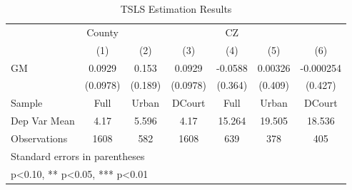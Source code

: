 \begin{table}[htbp]\centering
\def\sym#1{\ifmmode^{#1}\else\(^{#1}\)\fi}
\caption{TSLS Estimation Results}
\begin{tabular}{l*{6}{c}}
\toprule
                    &      County   &               &               &          CZ   &               &               \\
                    &\multicolumn{1}{c}{(1)}   &\multicolumn{1}{c}{(2)}   &\multicolumn{1}{c}{(3)}   &\multicolumn{1}{c}{(4)}   &\multicolumn{1}{c}{(5)}   &\multicolumn{1}{c}{(6)}   \\
\midrule
GM                  &      0.0929   &       0.153   &      0.0929   &     -0.0588   &     0.00326   &   -0.000254   \\
                    &    (0.0978)   &     (0.189)   &    (0.0978)   &     (0.364)   &     (0.409)   &     (0.427)   \\
\midrule
Sample              &        Full   &       Urban   &      DCourt   &        Full   &       Urban   &      DCourt   \\
Dep Var Mean        &        4.17   &       5.596   &        4.17   &      15.264   &      19.505   &      18.536   \\
Observations        &        1608   &         582   &        1608   &         639   &         378   &         405   \\
\bottomrule
\multicolumn{7}{l}{\footnotesize Standard errors in parentheses}\\
\multicolumn{7}{l}{\footnotesize * p<0.10, ** p<0.05, *** p<0.01}\\
\end{tabular}
\end{table}
